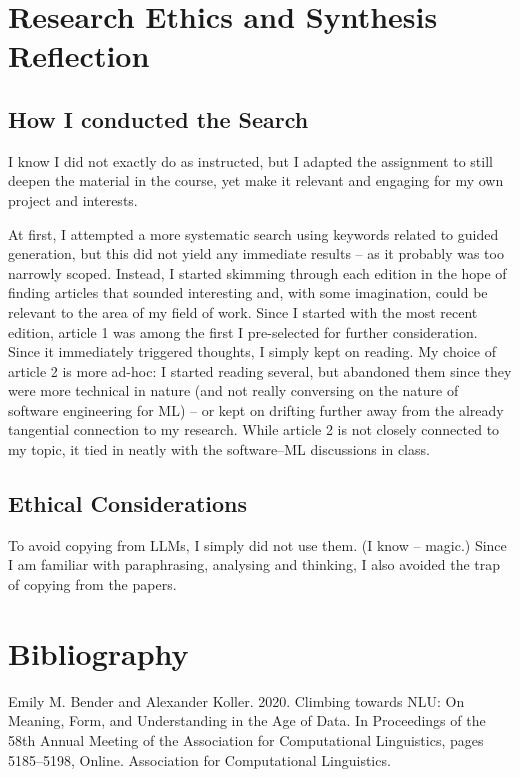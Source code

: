 \documentclass[a4paper, 11pt]{article}
\begin{document}
\section{Research Ethics and Synthesis Reflection}
\subsection{How I conducted the Search}
I know I did not exactly do as instructed, but I adapted the assignment to still deepen the material in the course, yet make it relevant and engaging for my own project and interests.

At first, I attempted a more systematic search using keywords related to guided generation, but this did not yield any immediate results – as it probably was too narrowly scoped. Instead, I started skimming through each edition in the hope of finding articles that sounded interesting and, with some imagination, could be relevant to the area of my field of work. Since I started with the most recent edition, article 1 was among the first I pre-selected for further consideration. Since it immediately triggered thoughts, I simply kept on reading. My choice of article 2 is more ad-hoc:  I started reading several, but abandoned them since they were more technical in nature (and not really conversing on the nature of software engineering for ML) – or kept on drifting further away from the already tangential connection to my research. While article 2 is not closely connected to my topic, it tied in neatly with the software–ML discussions in class. 

\subsection{Ethical Considerations}
To avoid copying from LLMs, I simply did not use them. (I know -- magic.) Since I am familiar with paraphrasing, analysing and thinking, I also avoided the trap of copying from the papers.

\section*{Bibliography}
Emily M. Bender and Alexander Koller. 2020. Climbing towards NLU: On Meaning, Form, and Understanding in the Age of Data. In Proceedings of the 58th Annual Meeting of the Association for Computational Linguistics, pages 5185–5198, Online. Association for Computational Linguistics.
\end{document}

